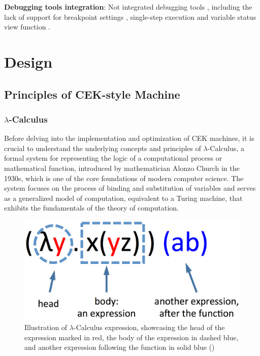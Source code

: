 \documentclass{l4proj}
\begin{document}
\textbf{Debugging tools integration}: Not integrated debugging tools , including the lack of support for breakpoint settings , single-step execution and variable status view function .


\chapter{Design}

\section{Principles of CEK-style Machine}

\subsection{\texorpdfstring{$\lambda$}{lambda}-Calculus}
Before delving into the implementation and optimization of CEK machines, it is crucial to understand the underlying concepts and principles of $\lambda$-Calculus, a formal system for representing the logic of a computational process or mathematical function, introduced by mathematician Alonzo Church in the 1930s, which is one of the core foundations of modern computer science. The system focuses on the process of binding and substitution of variables and serves as a generalized model of computation, equivalent to a Turing machine, that exhibits the fundamentals of the theory of computation.

\begin{figure}[h]
    \centering
    \includegraphics[width=0.35\linewidth]{dissertation/images/lambda1.png}    
    \caption{Illustration of $\lambda$-Calculus expression, showcasing the head of the expression marked in red, the body of the expression in dashed blue, and another expression following the function in solid blue (\cite{a2015_the})}
    \label{fig:lambda} 
\end{figure}
\end{document}
